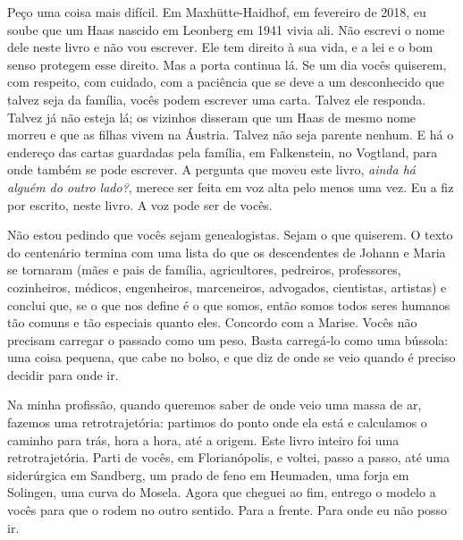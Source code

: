 \documentclass[
  brazilian,
  11pt,
  openany]{book}
\begin{document}
Peço uma coisa mais difícil. Em Maxhütte-Haidhof, em fevereiro de 2018,
eu soube que um Haas nascido em Leonberg em 1941 vivia ali. Não escrevi
o nome dele neste livro e não vou escrever. Ele tem direito à sua vida,
e a lei e o bom senso protegem esse direito. Mas a porta continua lá. Se
um dia vocês quiserem, com respeito, com cuidado, com a paciência que se
deve a um desconhecido que talvez seja da família, vocês podem escrever
uma carta. Talvez ele responda. Talvez já não esteja lá; os vizinhos
disseram que um Haas de mesmo nome morreu e que as filhas vivem na
Áustria. Talvez não seja parente nenhum. E há o endereço das cartas
guardadas pela família, em Falkenstein, no Vogtland, para onde também se
pode escrever. A pergunta que moveu este livro, \emph{ainda há alguém do
outro lado?}, merece ser feita em voz alta pelo menos uma vez. Eu a fiz
por escrito, neste livro. A voz pode ser de vocês.

Não estou pedindo que vocês sejam genealogistas. Sejam o que quiserem. O
texto do centenário termina com uma lista do que os descendentes de
Johann e Maria se tornaram (mães e pais de família, agricultores,
pedreiros, professores, cozinheiros, médicos, engenheiros, marceneiros,
advogados, cientistas, artistas) e conclui que, se o que nos define é o
que somos, então somos todos seres humanos tão comuns e tão especiais
quanto eles. Concordo com a Marise. Vocês não precisam carregar o
passado como um peso. Basta carregá-lo como uma bússola: uma coisa
pequena, que cabe no bolso, e que diz de onde se veio quando é preciso
decidir para onde ir.

Na minha profissão, quando queremos saber de onde veio uma massa de ar,
fazemos uma retrotrajetória: partimos do ponto onde ela está e
calculamos o caminho para trás, hora a hora, até a origem. Este livro
inteiro foi uma retrotrajetória. Parti de vocês, em Florianópolis, e
voltei, passo a passo, até uma siderúrgica em Sandberg, um prado de feno
em Heumaden, uma forja em Solingen, uma curva do Mosela. Agora que
cheguei ao fim, entrego o modelo a vocês para que o rodem no outro
sentido. Para a frente. Para onde eu não posso ir.
\end{document}
